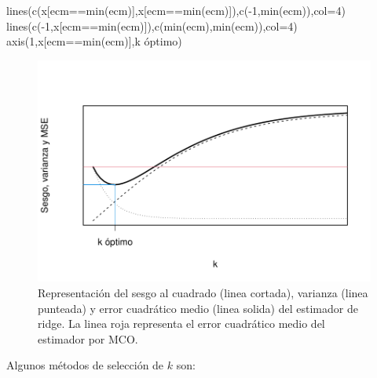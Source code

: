 \documentclass[
]{article}
\newenvironment{Shaded}{\begin{snugshade}}{\end{snugshade}}
\newcommand{\AttributeTok}[1]{\textcolor[rgb]{0.77,0.63,0.00}{#1}}
\newcommand{\DecValTok}[1]{\textcolor[rgb]{0.00,0.00,0.81}{#1}}
\newcommand{\FunctionTok}[1]{\textcolor[rgb]{0.00,0.00,0.00}{#1}}
\newcommand{\NormalTok}[1]{#1}
\newcommand{\SpecialCharTok}[1]{\textcolor[rgb]{0.00,0.00,0.00}{#1}}
\newcommand{\StringTok}[1]{\textcolor[rgb]{0.31,0.60,0.02}{#1}}
\begin{document}
\begin{Shaded}
\begin{Highlighting}[]
\FunctionTok{lines}\NormalTok{(}\FunctionTok{c}\NormalTok{(x[ecm}\SpecialCharTok{==}\FunctionTok{min}\NormalTok{(ecm)],x[ecm}\SpecialCharTok{==}\FunctionTok{min}\NormalTok{(ecm)]),}\FunctionTok{c}\NormalTok{(}\SpecialCharTok{{-}}\DecValTok{1}\NormalTok{,}\FunctionTok{min}\NormalTok{(ecm)),}\AttributeTok{col=}\DecValTok{4}\NormalTok{)}
\FunctionTok{lines}\NormalTok{(}\FunctionTok{c}\NormalTok{(}\SpecialCharTok{{-}}\DecValTok{1}\NormalTok{,x[ecm}\SpecialCharTok{==}\FunctionTok{min}\NormalTok{(ecm)]),}\FunctionTok{c}\NormalTok{(}\FunctionTok{min}\NormalTok{(ecm),}\FunctionTok{min}\NormalTok{(ecm)),}\AttributeTok{col=}\DecValTok{4}\NormalTok{)}
\FunctionTok{axis}\NormalTok{(}\DecValTok{1}\NormalTok{,x[ecm}\SpecialCharTok{==}\FunctionTok{min}\NormalTok{(ecm)],}\StringTok{\textquotesingle{}k óptimo\textquotesingle{}}\NormalTok{)}
\end{Highlighting}
\end{Shaded}

\begin{figure}

{\centering \includegraphics{MLG2_files/figure-latex/ECMrepresentacion-1} 

}

\caption{Representación del sesgo al cuadrado (linea cortada), varianza (linea punteada) y error cuadrático medio (linea solida) del estimador de ridge. La linea roja representa el error cuadrático medio del estimador por MCO.}\label{fig:ECMrepresentacion}
\end{figure}

Algunos métodos de selección de \(k\) son:
\end{document}
